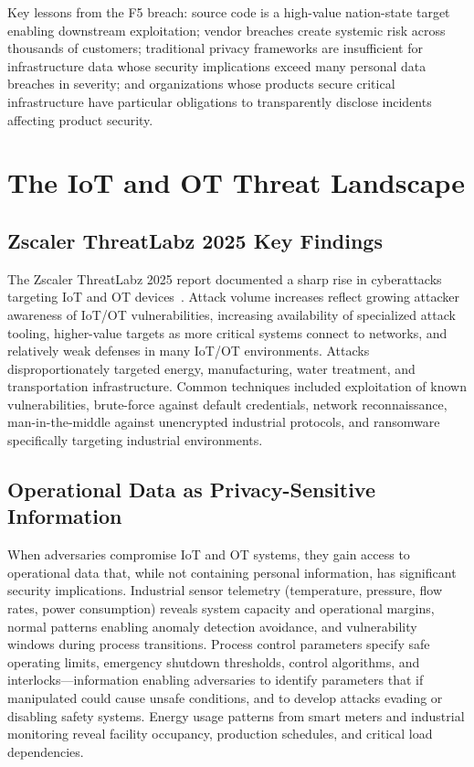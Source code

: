 \documentclass[sigconf,nonacm]{acmart}
\begin{document}
Key lessons from the F5 breach: source code is a high-value nation-state target enabling
downstream exploitation; vendor breaches create systemic risk across thousands of
customers; traditional privacy frameworks are insufficient for infrastructure data whose
security implications exceed many personal data breaches in severity; and organizations
whose products secure critical infrastructure have particular obligations to transparently
disclose incidents affecting product security.

\section{The IoT and OT Threat Landscape}

\subsection{Zscaler ThreatLabz 2025 Key Findings}

The Zscaler ThreatLabz 2025 report documented a sharp rise in cyberattacks targeting
IoT and OT devices~\cite{zscaler2025threat}. Attack volume increases reflect growing
attacker awareness of IoT/OT vulnerabilities, increasing availability of specialized
attack tooling, higher-value targets as more critical systems connect to networks, and
relatively weak defenses in many IoT/OT environments. Attacks disproportionately
targeted energy, manufacturing, water treatment, and transportation infrastructure.
Common techniques included exploitation of known vulnerabilities, brute-force against
default credentials, network reconnaissance, man-in-the-middle against unencrypted
industrial protocols, and ransomware specifically targeting industrial environments.

\subsection{Operational Data as Privacy-Sensitive Information}

When adversaries compromise IoT and OT systems, they gain access to operational data
that, while not containing personal information, has significant security implications.
Industrial sensor telemetry (temperature, pressure, flow rates, power consumption)
reveals system capacity and operational margins, normal patterns enabling anomaly
detection avoidance, and vulnerability windows during process transitions. Process
control parameters specify safe operating limits, emergency shutdown thresholds, control
algorithms, and interlocks---information enabling adversaries to identify parameters that
if manipulated could cause unsafe conditions, and to develop attacks evading or disabling
safety systems. Energy usage patterns from smart meters and industrial monitoring reveal
facility occupancy, production schedules, and critical load dependencies.
\end{document}
